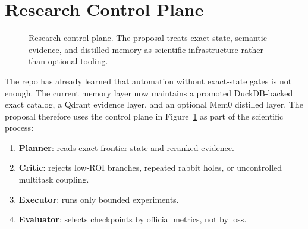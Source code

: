 \documentclass[11pt]{article}
\begin{document}
\section{Research Control Plane}
\begin{figure}[t]
\centering
{}
\caption{Research control plane. The proposal treats exact state, semantic evidence, and distilled
memory as scientific infrastructure rather than optional tooling.}
\label{fig:control}
\end{figure}

The repo has already learned that automation without exact-state gates is not enough. The current
memory layer now maintains a promoted DuckDB-backed exact catalog, a Qdrant evidence layer, and an
optional Mem0 distilled layer. The proposal therefore uses the control plane in
Figure~\ref{fig:control} as part of the scientific process:
\begin{enumerate}[leftmargin=*,itemsep=2pt]
\item \textbf{Planner}: reads exact frontier state and reranked evidence.
\item \textbf{Critic}: rejects low-ROI branches, repeated rabbit holes, or uncontrolled multitask
coupling.
\item \textbf{Executor}: runs only bounded experiments.
\item \textbf{Evaluator}: selects checkpoints by official metrics, not by loss.
\end{enumerate}
\end{document}
